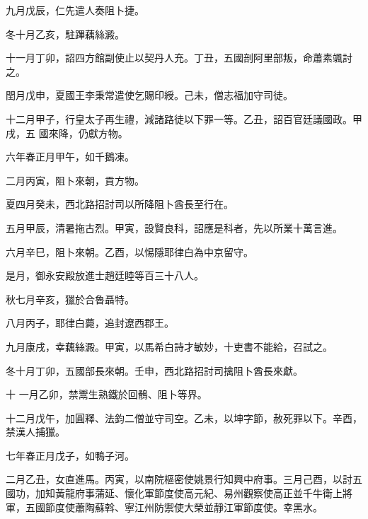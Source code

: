 \begin{pinyinscope}
 九月戊辰，仁先遣人奏阻卜捷。



 冬十月乙亥，駐蹕藕絲澱。



 十一月丁卯，詔四方館副使止以契丹人充。丁丑，五國剖阿里部叛，命蕭素颯討之。



 閏月戊申，夏國王李秉常遣使乞賜印綬。己未，僧志福加守司徒。



 十二月甲子，行皇太子再生禮，減諸路徒以下罪一等。乙丑，詔百官廷議國政。甲戌，五
 國來降，仍獻方物。



 六年春正月甲午，如千鵝凍。



 二月丙寅，阻卜來朝，貢方物。



 夏四月癸未，西北路招討司以所降阻卜酋長至行在。



 五月甲辰，清暑拖古烈。甲寅，設賢良科，詔應是科者，先以所業十萬言進。



 六月辛巳，阻卜來朝。乙酉，以惕隱耶律白為中京留守。



 是月，御永安殿放進士趙廷睦等百三十八人。



 秋七月辛亥，獵於合魯聶特。



 八月丙子，耶律白薨，追封遼西郡王。



 九月康戌，幸藕絲澱。甲寅，以馬希白詩才敏妙，十吏書不能給，召試之。



 冬十月丁卯，五國部長來朝。壬申，西北路招討司擒阻卜酋長來獻。



 十
 一月乙卯，禁鬻生熟鐵於回鶻、阻卜等界。



 十二月戊午，加圓釋、法鈞二僧並守司空。乙未，以坤字節，赦死罪以下。辛酉，禁漢人捕獵。



 七年春正月戊子，如鴨子河。



 二月乙丑，女直進馬。丙寅，以南院樞密使姚景行知興中府事。三月己酉，以討五國功，加知黃龍府事蒲延、懷化軍節度使高元紀、易州觀察使高正並千牛衛上將軍，五國節度使蕭陶蘇斡、寧江州防禦使大榮並靜江軍節度使。幸黑水。




\end{pinyinscope}
